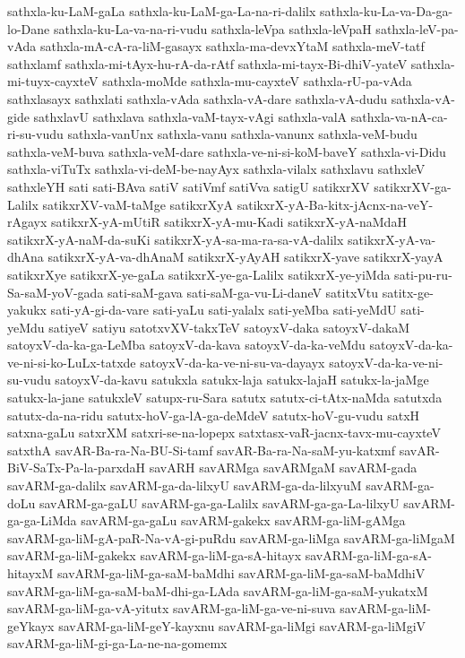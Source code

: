 {sathxla-ku-LaM-gaLa
sathxla-ku-LaM-ga-La-na-ri-dalilx
sathxla-ku-La-va-Da-ga-lo-Dane
sathxla-ku-La-va-na-ri-vudu
sathxla-leVpa
sathxla-leVpaH
sathxla-leV-pa-vAda
sathxla-mA-cA-ra-liM-gasayx
sathxla-ma-devxYtaM
sathxla-meV-tatf
sathxlamf
sathxla-mi-tAyx-hu-rA-da-rAtf
sathxla-mi-tayx-Bi-dhiV-yateV
sathxla-mi-tuyx-cayxteV
sathxla-moMde
sathxla-mu-cayxteV
sathxla-rU-pa-vAda
sathxlasayx
sathxlati
sathxla-vAda
sathxla-vA-dare
sathxla-vA-dudu
sathxla-vA-gide
sathxlavU
sathxlava
sathxla-vaM-tayx-vAgi
sathxla-valA
sathxla-va-nA-ca-ri-su-vudu
sathxla-vanUnx
sathxla-vanu
sathxla-vanunx
sathxla-veM-budu
sathxla-veM-buva
sathxla-veM-dare
sathxla-ve-ni-si-koM-baveY
sathxla-vi-Didu
sathxla-viTuTx
sathxla-vi-deM-be-nayAyx
sathxla-vilalx
sathxlavu
sathxleV
sathxleYH
sati
sati-BAva
satiV
satiVmf
satiVva
satigU
satikxrXV
satikxrXV-ga-Lalilx
satikxrXV-vaM-taMge
satikxrXyA
satikxrX-yA-Ba-kitx-jAcnx-na-veY-rAgayx
satikxrX-yA-mUtiR
satikxrX-yA-mu-Kadi
satikxrX-yA-naMdaH
satikxrX-yA-naM-da-suKi
satikxrX-yA-sa-ma-ra-sa-vA-dalilx
satikxrX-yA-va-dhAna
satikxrX-yA-va-dhAnaM
satikxrX-yAyAH
satikxrX-yave
satikxrX-yayA
satikxrXye
satikxrX-ye-gaLa
satikxrX-ye-ga-Lalilx
satikxrX-ye-yiMda
sati-pu-ru-Sa-saM-yoV-gada
sati-saM-gava
sati-saM-ga-vu-Li-daneV
satitxVtu
satitx-ge-yakukx
sati-yA-gi-da-vare
sati-yaLu
sati-yalalx
sati-yeMba
sati-yeMdU
sati-yeMdu
satiyeV
satiyu
satotxvXV-takxTeV
satoyxV-daka
satoyxV-dakaM
satoyxV-da-ka-ga-LeMba
satoyxV-da-kava
satoyxV-da-ka-veMdu
satoyxV-da-ka-ve-ni-si-ko-LuLx-tatxde
satoyxV-da-ka-ve-ni-su-va-dayayx
satoyxV-da-ka-ve-ni-su-vudu
satoyxV-da-kavu
satukxla
satukx-laja
satukx-lajaH
satukx-la-jaMge
satukx-la-jane
satukxleV
satupx-ru-Sara
satutx
satutx-ci-tAtx-naMda
satutxda
satutx-da-na-ridu
satutx-hoV-ga-lA-ga-deMdeV
satutx-hoV-gu-vudu
satxH
satxna-gaLu
satxrXM
satxri-se-na-lopepx
satxtasx-vaR-jacnx-tavx-mu-cayxteV
satxthA
savAR-Ba-ra-Na-BU-Si-tamf
savAR-Ba-ra-Na-saM-yu-katxmf
savAR-BiV-SaTx-Pa-la-parxdaH
savARH
savARMga
savARMgaM
savARM-gada
savARM-ga-dalilx
savARM-ga-da-lilxyU
savARM-ga-da-lilxyuM
savARM-ga-doLu
savARM-ga-gaLU
savARM-ga-ga-Lalilx
savARM-ga-ga-La-lilxyU
savARM-ga-ga-LiMda
savARM-ga-gaLu
savARM-gakekx
savARM-ga-liM-gAMga
savARM-ga-liM-gA-paR-Na-vA-gi-puRdu
savARM-ga-liMga
savARM-ga-liMgaM
savARM-ga-liM-gakekx
savARM-ga-liM-ga-sA-hitayx
savARM-ga-liM-ga-sA-hitayxM
savARM-ga-liM-ga-saM-baMdhi
savARM-ga-liM-ga-saM-baMdhiV
savARM-ga-liM-ga-saM-baM-dhi-ga-LAda
savARM-ga-liM-ga-saM-yukatxM
savARM-ga-liM-ga-vA-yitutx
savARM-ga-liM-ga-ve-ni-suva
savARM-ga-liM-geYkayx
savARM-ga-liM-geY-kayxnu
savARM-ga-liMgi
savARM-ga-liMgiV
savARM-ga-liM-gi-ga-La-ne-na-gomemx
}
